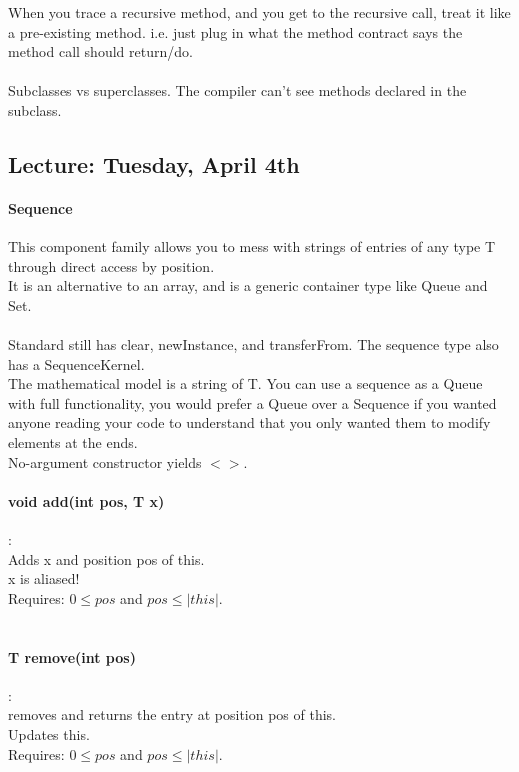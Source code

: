 \documentclass[10pt]{article}
\begin{document}
\maketitle

When you trace a recursive method, and you get to the recursive call, treat it like a pre-existing method. i.e. just plug in what the method contract says the method call should return/do. \\\\
Subclasses vs superclasses. The compiler can't see methods declared in the subclass. 

\subsection*{Lecture: Tuesday, April 4th}
\paragraph*{Sequence} This component family allows you to mess with strings of entries of any type T through direct access by position. \\
It is an alternative to an array, and is a generic container type like Queue and Set. \\\\
Standard still has clear, newInstance, and transferFrom. The sequence type also has a SequenceKernel. \\
The mathematical model is a string of T. You can use a sequence as a Queue with full functionality, you would prefer a Queue over a Sequence if you wanted anyone reading your code to understand that you only wanted them to modify elements at the ends. \\
No-argument constructor yields $<>$. \\


\paragraph{void add(int pos, T x)}:\\
Adds x and position pos of this. \\
x is aliased!\\
Requires: $0 \leq pos$ and $pos \leq |this|$. \\\\

\paragraph{T remove(int pos)}:\\
removes and returns the entry at position pos of this. \\
Updates this.\\
Requires: $0 \leq pos$ and $pos \leq |this|$. \\\\
\end{document}
